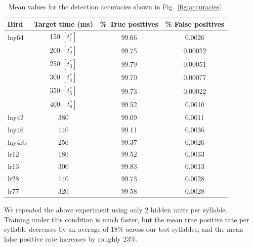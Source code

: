 \documentclass[10pt,letterpaper]{article}
\newcommand\fig[1]{Fig.~\ref{#1}}
\begin{document}
\begin{table}
  \begin{tabular}{lc|cc}
    Bird & Target time (ms) & \% True positives & \% False positives \\ \hline
lny64 & 	150 $[t^*_1]$ & 	99.66 & 	0.0026 \\ %
      & 	200 $[t^*_2]$ & 	99.75 & 	0.00052 \\ %
      & 	250 $[t^*_3]$ & 	99.79 & 	0.00051 \\ %
      & 	300 $[t^*_4]$ & 	99.70 & 	0.00077 \\ %
      & 	350 $[t^*_5]$ & 	99.73 & 	0.00022 \\ %
      & 	400 $[t^*_6]$ & 	99.52 & 	0.0010 \\ %
lny42 & 	380 & 	99.09 & 	0.0011 \\ %
lny46 & 	140 & 	99.11 & 	0.0036 \\ %
lny4rb & 	250 & 	99.37 & 	0.0026 \\ %
lr12 & 	180 & 	99.52 & 	0.0033 \\ %
lr13 & 	300 & 	99.83 & 	0.0013 \\ %
lr28 & 	140 & 	99.73 & 	0.0028 \\ %
lr77 & 	320 & 	99.58 & 	0.0028  %
  \end{tabular}
  \caption{Mean values for the detection accuracies shown in \fig{fig:accuracies}.}
  \label{table:accuracies}
\end{table}
  

We repeated the above experiment using only 2 hidden units per
syllable.  Training under this condition is much faster, but the mean
true positive rate per syllable decreases by an average of 18\% across
our test syllables, and the mean false positive rate increases by
roughly 23\%.
\end{document}
